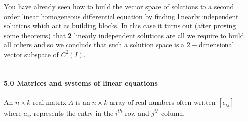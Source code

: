 \documentclass{amsart}
\begin{document}
You have already seen how to build the vector space of solutions to a second order linear homogeneous differential equation by finding linearly independent solutions which act as building blocks. In this case it turns out (after proving some theorems) that {\bf 2} linearly independent solutions are all we require to build all others and so we conclude that such a solution space is a $2-$dimensional vector subspace of $C^{2}(I)$.\\
\\\\
{\bf 5.0 Matrices and systems of linear equations}\\\\
An $n\times k$ real matrix $A$ is an $n\times k$ array of real numbers often written $[a_{ij}]$ where $a_{ij}$ represents the entry in the $i^{th}$ row and $j^{th}$ column.\\
 
\end{document}
